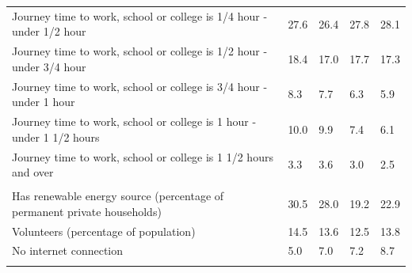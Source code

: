 \documentclass{article}
\begin{document}
\begin{table}[h]
\begin{tabular}{KTTTT}
Journey time to work, school or college is 1/4 hour - under 1/2 hour & 27.6& 26.4& 27.8& 28.1\\
Journey time to work, school or college is 1/2 hour - under 3/4 hour & 18.4& 17.0& 17.7& 17.3\\
Journey time to work, school or college is 3/4 hour - under 1 hour & 8.3& 7.7& 6.3& 5.9\\
Journey time to work, school or college is 1 hour - under 1 1/2 hours & 10.0&  9.9&  7.4&  6.1\\
Journey time to work, school or college is 1 1/2 hours and over & 3.3& 3.6& 3.0& 2.5\\
\hline
    \\ 
    \hline
Has renewable energy source (percentage of permanent private households) & 30.5& 28.0& 19.2& 22.9\\
    \hline
Volunteers (percentage of population) & 14.5& 13.6& 12.5& 13.8\\
    \hline
No internet connection& 5.0& 7.0& 7.2& 8.7\\
\hline
\end{tabular}
\end{table}
\end{document}
